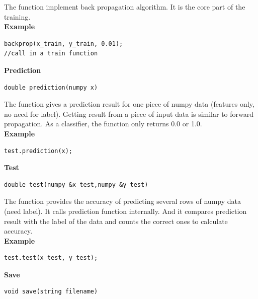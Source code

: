 \documentclass[a4paper]{article}
\begin{document}
The function implement back propagation algorithm. It is the core part of the training.\\
\textbf{Example}
\begin{lstlisting}[language={[ANSI]C++},keywordstyle=\color{blue!70},commentstyle=\color{red!50!green!50!blue!50},frame=shadowbox, rulesepcolor=\color{red!20!green!20!blue!20}]
backprop(x_train, y_train, 0.01);
//call in a train function
\end{lstlisting}
\textbf{\Large Prediction}
\begin{lstlisting}[language={[ANSI]C++},keywordstyle=\color{blue!70},commentstyle=\color{red!50!green!50!blue!50},frame=shadowbox, rulesepcolor=\color{red!20!green!20!blue!20}]
double prediction(numpy x)
\end{lstlisting}

The function gives a prediction result for one piece of numpy data (features only, no need for label). Getting result from a piece of input data is similar to forward propagation. As a classifier, the function only returns 0.0 or 1.0.\\
\textbf{Example}
\begin{lstlisting}[language={[ANSI]C++},keywordstyle=\color{blue!70},commentstyle=\color{red!50!green!50!blue!50},frame=shadowbox, rulesepcolor=\color{red!20!green!20!blue!20}]
test.prediction(x);
\end{lstlisting}
\textbf{\Large Test}
\begin{lstlisting}[language={[ANSI]C++},keywordstyle=\color{blue!70},commentstyle=\color{red!50!green!50!blue!50},frame=shadowbox, rulesepcolor=\color{red!20!green!20!blue!20}]
double test(numpy &x_test,numpy &y_test)
\end{lstlisting}

The function provides the accuracy of predicting several rows of numpy data (need label). It calls prediction function internally. And it compares prediction result with the label of the data and counts the correct ones to calculate accuracy. \\
\textbf{Example}
\begin{lstlisting}[language={[ANSI]C++},keywordstyle=\color{blue!70},commentstyle=\color{red!50!green!50!blue!50},frame=shadowbox, rulesepcolor=\color{red!20!green!20!blue!20}]
test.test(x_test, y_test);
\end{lstlisting}
\textbf{\Large Save}
\begin{lstlisting}[language={[ANSI]C++},keywordstyle=\color{blue!70},commentstyle=\color{red!50!green!50!blue!50},frame=shadowbox, rulesepcolor=\color{red!20!green!20!blue!20}]
void save(string filename)
\end{lstlisting}
\end{document}
